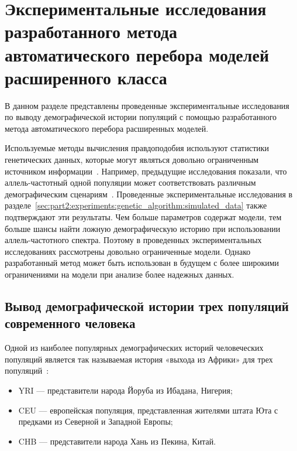 \FloatBarrier
\section{Экспериментальные исследования разработанного метода автоматического перебора моделей расширенного класса}
\label{sec:part4:experiments}

В данном разделе представлены проведенные экспериментальные исследования по выводу демографической истории популяций с помощью разработанного метода автоматического перебора расширенных моделей.

Используемые методы вычисления правдоподобия используют статистики генетических данных, которые могут являться довольно ограниченным источником информации~\cite{beichman2018using}.
Например, предыдущие исследования показали, что аллель-частотный одной популяции может соответствовать различным демографическим сценариям~\cite{myers2008can,rosen2018geometry}.
Проведенные экспериментальные исследования в разделе~\ref{sec:part2:experiments:genetic_algorithm:simulated_data} также подтверждают эти результаты.
Чем больше параметров содержат модели, тем больше шансы найти ложную демографическую историю при использовании аллель-частотного спектра.
Поэтому в проведенных экспериментальных исследованиях рассмотрены довольно ограниченные модели.
Однако разработанный метод может быть использован в будущем с более широкими ограничениями на модели при анализе более надежных данных.

\subsection{Вывод демографической истории трех популяций современного человека}

Одной из наиболее популярных демографических историй человеческих популяций является так называемая история «выхода из Африки» для трех популяций~\cite{gutenkunst2009inferring, jouganous2017inferring, harris2013inferring}:
\begin{itemize}
    \item YRI --- представители народа Йоруба из Ибадана, Нигерия;
    \item CEU --- европейская популяция, представленная жителями штата Юта с предками из Северной и Западной Европы;
    \item CHB --- представители народа Хань из Пекина, Китай.
\end{itemize}

